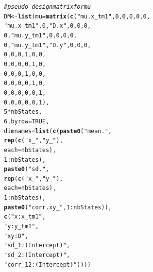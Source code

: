 \documentclass[12pt]{article}\usepackage[]{graphicx}\usepackage[]{xcolor}
\makeatletter
\newcommand{\hlnum}[1]{\textcolor[rgb]{0.686,0.059,0.569}{#1}}%
\newcommand{\hlsng}[1]{\textcolor[rgb]{0.192,0.494,0.8}{#1}}%
\newcommand{\hlcom}[1]{\textcolor[rgb]{0.678,0.584,0.686}{\textit{#1}}}%
\newcommand{\hlopt}[1]{\textcolor[rgb]{0,0,0}{#1}}%
\newcommand{\hldef}[1]{\textcolor[rgb]{0.345,0.345,0.345}{#1}}%
\newcommand{\hlkwb}[1]{\textcolor[rgb]{0.69,0.353,0.396}{#1}}%
\newcommand{\hlkwc}[1]{\textcolor[rgb]{0.333,0.667,0.333}{#1}}%
\newcommand{\hlkwd}[1]{\textcolor[rgb]{0.737,0.353,0.396}{\textbf{#1}}}%
\newenvironment{kframe}{%
 \def\at@end@of@kframe{}%
 \ifinner\ifhmode%
  \def\at@end@of@kframe{\end{minipage}}%
  \begin{minipage}{\columnwidth}%
 \fi\fi%
 \def\FrameCommand##1{\hskip\@totalleftmargin \hskip-\fboxsep
 \colorbox{shadecolor}{##1}\hskip-\fboxsep
     \hskip-\linewidth \hskip-\@totalleftmargin \hskip\columnwidth}%
 \MakeFramed {\advance\hsize-\width
   \@totalleftmargin\z@ \linewidth\hsize
   \@setminipage}}%
 {\par\unskip\endMakeFramed%
 \at@end@of@kframe}
\newenvironment{knitrout}{}{} %
\let\hlstd\hldef
\let\hlstr\hlsng
\makeatother
\begin{document}
\begin{knitrout}
\begin{kframe}
\begin{alltt}
\hlcom{# pseudo-design matrix for mu}
\hlstd{DM} \hlkwb{<-} \hlkwd{list}\hlstd{(}\hlkwc{mu}\hlstd{=}\hlkwd{matrix}\hlstd{(}\hlkwd{c}\hlstd{(}\hlstr{"mu.x_tm1"}\hlstd{,}         \hlnum{0}\hlstd{,}    \hlnum{0}\hlstd{,}\hlnum{0}\hlstd{,}\hlnum{0}\hlstd{,}\hlnum{0}\hlstd{,}
                       \hlstr{"mu.x_tm1"}\hlstd{,}         \hlnum{0}\hlstd{,}\hlstr{"D.x"}\hlstd{,}\hlnum{0}\hlstd{,}\hlnum{0}\hlstd{,}\hlnum{0}\hlstd{,}
                                \hlnum{0}\hlstd{,}\hlstr{"mu.y_tm1"}\hlstd{,}    \hlnum{0}\hlstd{,}\hlnum{0}\hlstd{,}\hlnum{0}\hlstd{,}\hlnum{0}\hlstd{,}
                                \hlnum{0}\hlstd{,}\hlstr{"mu.y_tm1"}\hlstd{,}\hlstr{"D.y"}\hlstd{,}\hlnum{0}\hlstd{,}\hlnum{0}\hlstd{,}\hlnum{0}\hlstd{,}
                                \hlnum{0}\hlstd{,}         \hlnum{0}\hlstd{,}    \hlnum{0}\hlstd{,}\hlnum{1}\hlstd{,}\hlnum{0}\hlstd{,}\hlnum{0}\hlstd{,}
                                \hlnum{0}\hlstd{,}         \hlnum{0}\hlstd{,}    \hlnum{0}\hlstd{,}\hlnum{0}\hlstd{,}\hlnum{1}\hlstd{,}\hlnum{0}\hlstd{,}
                                \hlnum{0}\hlstd{,}         \hlnum{0}\hlstd{,}    \hlnum{0}\hlstd{,}\hlnum{1}\hlstd{,}\hlnum{0}\hlstd{,}\hlnum{0}\hlstd{,}
                                \hlnum{0}\hlstd{,}         \hlnum{0}\hlstd{,}    \hlnum{0}\hlstd{,}\hlnum{0}\hlstd{,}\hlnum{1}\hlstd{,}\hlnum{0}\hlstd{,}
                                \hlnum{0}\hlstd{,}         \hlnum{0}\hlstd{,}    \hlnum{0}\hlstd{,}\hlnum{0}\hlstd{,}\hlnum{0}\hlstd{,}\hlnum{1}\hlstd{,}
                                \hlnum{0}\hlstd{,}         \hlnum{0}\hlstd{,}    \hlnum{0}\hlstd{,}\hlnum{0}\hlstd{,}\hlnum{0}\hlstd{,}\hlnum{1}\hlstd{),}
                     \hlnum{5}\hlopt{*}\hlstd{nbStates,}
                     \hlnum{6}\hlstd{,}\hlkwc{byrow}\hlstd{=}\hlnum{TRUE}\hlstd{,}
                     \hlkwc{dimnames}\hlstd{=}\hlkwd{list}\hlstd{(}\hlkwd{c}\hlstd{(}\hlkwd{paste0}\hlstd{(}\hlstr{"mean."}\hlstd{,}
                                            \hlkwd{rep}\hlstd{(}\hlkwd{c}\hlstd{(}\hlstr{"x_"}\hlstd{,}\hlstr{"y_"}\hlstd{),}
                                                \hlkwc{each}\hlstd{=nbStates),}
                                            \hlnum{1}\hlopt{:}\hlstd{nbStates),}
                                     \hlkwd{paste0}\hlstd{(}\hlstr{"sd."}\hlstd{,}
                                            \hlkwd{rep}\hlstd{(}\hlkwd{c}\hlstd{(}\hlstr{"x_"}\hlstd{,}\hlstr{"y_"}\hlstd{),}
                                                \hlkwc{each}\hlstd{=nbStates),}
                                            \hlnum{1}\hlopt{:}\hlstd{nbStates),}
                                     \hlkwd{paste0}\hlstd{(}\hlstr{"corr.xy_"}\hlstd{,}\hlnum{1}\hlopt{:}\hlstd{nbStates)),}
                                   \hlkwd{c}\hlstd{(}\hlstr{"x:x_tm1"}\hlstd{,}
                                     \hlstr{"y:y_tm1"}\hlstd{,}
                                     \hlstr{"xy:D"}\hlstd{,}
                                     \hlstr{"sd_1:(Intercept)"}\hlstd{,}
                                     \hlstr{"sd_2:(Intercept)"}\hlstd{,}
                                     \hlstr{"corr_12:(Intercept)"}\hlstd{))))}


\end{alltt}
\end{kframe}
\end{knitrout}
\end{document}
